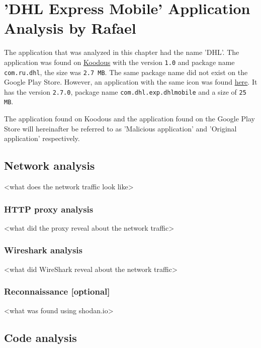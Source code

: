 \section{'DHL Express Mobile' Application Analysis by Rafael}

The application that was analyzed in this chapter had the name 'DHL'.
The application was found on \href{https://koodous.com/apks/38ff459a46e9ea6d63a83c1eddb640626fef562cd1bcb0ab3823c4770d07d0fb}{Koodous} with the version \texttt{1.0} and package name \texttt{com.ru.dhl}, the size was \texttt{2.7 MB}.
The same package name did not exist on the Google Play Store. However, an application with the same icon was found \href{https://play.google.com/store/apps/details?id=com.dhl.exp.dhlmobile}{here}. It has the version \texttt{2.7.0}, package name \texttt{com.dhl.exp.dhlmobile} and a size of \texttt{25 MB}.

The application found on Koodous and the application found on the Google Play Store will hereinafter be referred to as 'Malicious application' and 'Original application' respectively.





\newpage
\subsection{Network analysis}

<what does the network traffic look like>

\subsubsection{HTTP proxy analysis}

<what did the proxy reveal about the network traffic>

\subsubsection{Wireshark analysis}

<what did WireShark reveal about the network traffic>

\subsubsection{Reconnaissance [optional]}

<what was found using shodan.io>

\newpage
\subsection{Code analysis}

